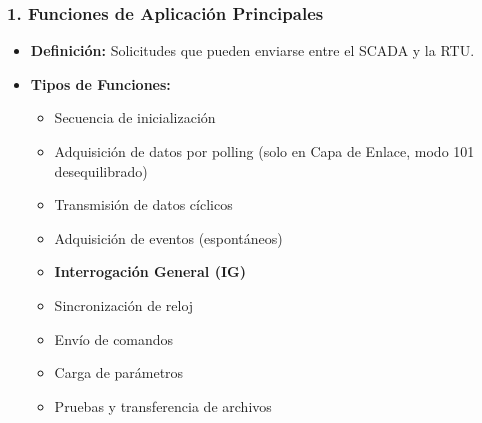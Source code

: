 \documentclass[a5paper]{book}%
\begin{document}
\subsubsection*{1. Funciones de Aplicación Principales}
\begin{itemize}
	\item \textbf{Definición:} Solicitudes que pueden enviarse entre el SCADA y la RTU.
	\item \textbf{Tipos de Funciones:}
	\begin{itemize}
		\item Secuencia de inicialización
		\item Adquisición de datos por polling (solo en Capa de Enlace, modo 101 desequilibrado)
		\item Transmisión de datos cíclicos
		\item Adquisición de eventos (espontáneos)
		\item \textbf{Interrogación General (IG)}
		\item Sincronización de reloj
		\item Envío de comandos
		\item Carga de parámetros
		\item Pruebas y transferencia de archivos
	\end{itemize}
\end{itemize}
\end{document}
